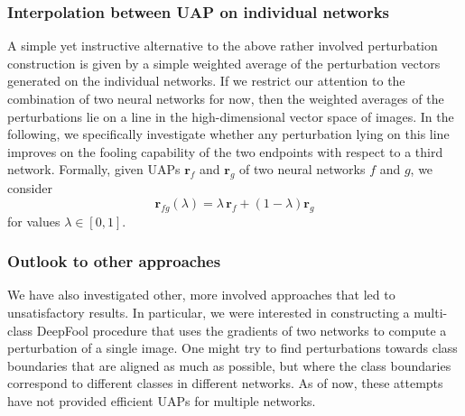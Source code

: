 \documentclass[runningheads]{llncs}
\begin{document}
\subsubsection{Interpolation between UAP on individual networks}
A simple yet instructive alternative to the above rather involved perturbation construction is given by a simple weighted average of the perturbation vectors generated on the individual networks. If we restrict our attention to the combination of two neural networks for now, then the weighted averages of the perturbations lie on a line in the high-dimensional vector space of images. In the following, we specifically investigate whether any perturbation lying on this line improves on the fooling capability of the two endpoints with respect to a third network.
Formally, given UAPs \(\mathbf{r}_f\) and \(\mathbf{r}_g\) of two neural networks $f$ and $g$, we consider \begin{equation}\label{eq:interp}
\mathbf{r}_{fg}\left(\lambda\right)=\lambda\,\mathbf{r}_f+\left(1-\lambda\right)\mathbf{r}_g
\end{equation}	
for values \(\lambda\in\left[0,1\right]\).

\subsubsection{Outlook to other approaches}
We have also investigated other, more involved approaches that led to unsatisfactory results. In particular, we were interested in constructing a multi-class DeepFool procedure that uses the gradients of two networks to compute a perturbation of a single image. One might try to find perturbations towards class boundaries that are aligned as much as possible, but where the class boundaries correspond to different classes in different networks. As of now, these attempts have not provided efficient UAPs for multiple networks.
\end{document}
